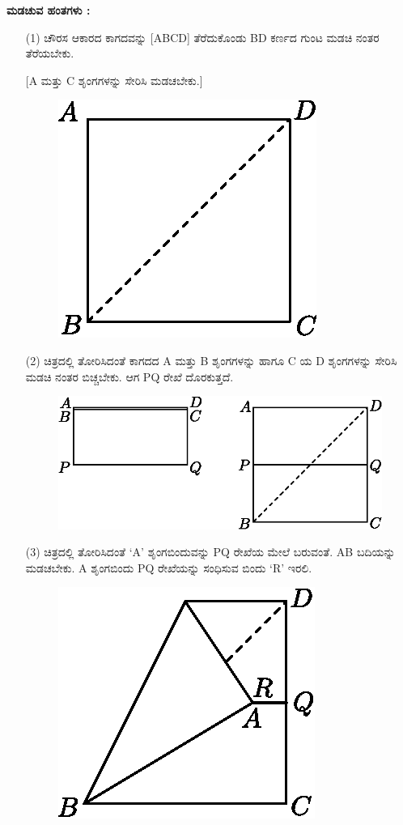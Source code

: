 \noindent
\textbf{ಮಡಚುವ ಹಂತಗಳು :}
\begin{itemize}
\item[(1)] ಚೌರಸ ಆಕಾರದ ಕಾಗದವನ್ನು [ABCD] ತೆರೆದುಕೊಂಡು BD ಕರ್ಣದ ಗುಂಟ ಮಡಚಿ ನಂತರ ತೆರೆಯಬೇಕು. 

[A ಮತ್ತು C ಶೃಂಗಗಳನ್ನು ಸೇರಿಸಿ ಮಡಚಬೇಕು.]
\begin{figure}[H]
\centering
\includegraphics[scale=.98]{src/figure/chap1/fig1-10a.eps}
\end{figure}

\item[(2)] ಚಿತ್ರದಲ್ಲಿ ತೋರಿಸಿದಂತೆ ಕಾಗದದ A ಮತ್ತು  B ಶೃಂಗಗಳನ್ನು ಹಾಗೂ  C ಯ D ಶೃಂಗಗಳನ್ನು ಸೇರಿಸಿ ಮಡಚಿ ನಂತರ ಬಿಚ್ಚಬೇಕು. ಆಗ PQ ರೇಖೆ ದೊರಕುತ್ತದೆ. 
\begin{figure}[H]
\centering
\includegraphics[scale=.98]{src/figure/chap1/fig1-10b.eps}
\end{figure}

\item[(3)] ಚಿತ್ರದಲ್ಲಿ ತೋರಿಸಿದಂತೆ  `A' ಶೃಂಗಬಿಂದುವನ್ನು PQ ರೇಖೆಯ ಮೇಲೆ ಬರುವಂತೆ.  AB ಬದಿಯನ್ನು ಮಡಚಬೇಕು.  A ಶೃಂಗಬಿಂದು  PQ ರೇಖೆಯನ್ನು ಸಂಧಿಸುವ ಬಿಂದು   `R' ಇರಲಿ. 
\begin{figure}[H]
\centering
\includegraphics[scale=.98]{src/figure/chap1/fig1-10c.eps}
\end{figure}


\end{itemize}
